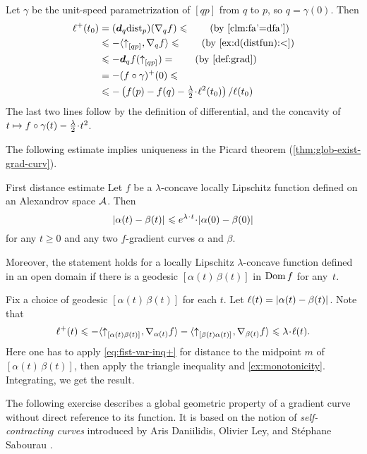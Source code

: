 Let $\gamma$ be the unit-speed parametrization of $[qp]$ from $q$ to $p$, so $q=\gamma(0)$.
Then 
\begin{align*}
\ell^+(t_0)&=(\dd_q\distfun_p)(\nabla_qf)\le\tag{by \ref{clm:fa'=dfa'}}
\\
&\le -\langle\dir qp,\nabla_qf\rangle \le \tag{by \ref{ex:d(distfun):<}}
\\
&\le -\dd_qf(\dir qp)=\tag{by \ref{def:grad}}
\\
&=-(f\circ\gamma)^+(0)\le 
\\
&\le -\left({f(p)}-{f(q)}-\tfrac\lambda2\cdot\ell^2(t_0)\right)/\ell(t_0)
\end{align*}
The last two lines follow by
the definition of differential,
and the concavity of $t\z\mapsto f\circ\gamma(t)-\tfrac \lambda2\cdot {t^2}$.
\qeds

The following estimate implies uniqueness in the Picard theorem (\ref{thm:glob-exist-grad-curv}).

\begin{thm}{First distance estimate}\label{thm:dist-est}
Let $f$ be a $\lambda$-concave locally Lipschitz function defined on an Alexandrov space $\mathcal{A}$.
Then
\[\dist{\alpha(t)}{\beta(t)}{}
\le 
e^{\lambda\cdot t}\cdot\dist[{{}}]{\alpha(0)}{\beta(0)}{}\]
for any $t\ge 0$ and any two $f$-gradient curves $\alpha$ and $\beta$.

Moreover, the statement holds for a locally Lipschitz $\lambda$-concave function defined in an open domain if there is a geodesic $[\alpha(t)\,\beta(t)]$ in $\mathop{\rm Dom}\nolimits f$ for any~$t$.
\end{thm}

Fix a choice of geodesic $[\alpha(t)\,\beta(t)]$ for each $t$.
Let $\ell(t)=|{\alpha(t)}-{\beta(t)}|_{}^{{}}$. 
Note that
\[\ell^+(t)
\le-
\<\dir{\alpha(t)}{\beta(t)},\nabla_{\alpha(t)}f\>-\<\dir{\beta(t)}{\alpha(t)},\nabla_{\beta(t)}f\>
\le
\lambda\cdot\ell(t).\]
Here one has to apply \ref{eq:fist-var-inq+} for distance to the midpoint $m$ of $[\alpha(t)\,\beta(t)]$, then apply the triangle inequality and \ref{ex:monotonicity}.
Integrating, we get the result.
\qeds



The following exercise describes a global geometric property of a gradient curve without direct reference to its function.
It is based on the notion of \emph{self-contracting curves} introduced by Aris Daniilidis, Olivier Ley, and Stéphane Sabourau \cite{daniilidis-ley-sabourau}.

